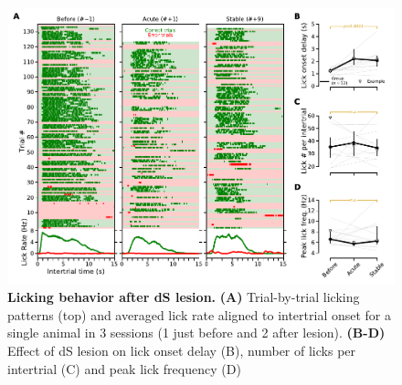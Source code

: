 \begin{figure}[bth!]
  \begin{center}
    \includegraphics[width=1\linewidth]{ch-lesion/figures/Lick.pdf}
    \caption[]
    {\textbf{Licking behavior after dS lesion.}
	\textbf{(A)} Trial-by-trial licking patterns (top) and averaged lick rate aligned to intertrial onset for a single animal in 3 sessions (1 just before and 2 after lesion). 
	\textbf{(B-D)} Effect of dS lesion on lick onset delay (B), number of licks per intertrial (C) and peak lick frequency (D)
	}
	\label{fig:lesion:lick}
  \end{center}
\end{figure}